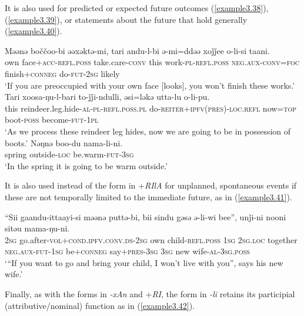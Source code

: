 \documentclass[output=paper,colorlinks,citecolor=brown]{langscibook}
\begin{document}
It is also used for predicted or expected future outcomes (\ref{example3.38}), (\ref{example3.39}), or statements about the future that hold generally (\ref{example3.40}).


\ea
\label{example3.38}
\gll Məənə	boččoo-bi			əəxəktə-mi,		tari	andu-l-bi ə-mi=ddəə			xoǰǰee			o-li-si		taani.\\
    	own		face+\textsc{acc}-\textsc{refl}.\textsc{poss}	take.care-\textsc{conv}	this	work-\textsc{pl}-\textsc{refl}.\textsc{poss}
	\textsc{neg}.\textsc{aux}-\textsc{conv}=\textsc{foc}	finish+\textsc{conneg}	do-\textsc{fut}-\textsc{2sg}	likely\\
\glt `If you are preoccupied with your own face [looks], you won’t finish these works.’
\ex
\label{example3.39}
\gll Tari	xoosa-ŋu-l-bari						to-ǰǰi-ndulli,				əsi=ləkə 	utta-lu		o-li-pu.\\
    	this	reindeer.leg.hide-\textsc{al}-\textsc{pl}-\textsc{refl}.\textsc{poss}.\textsc{pl}	do-\textsc{reiter}+\textsc{ipfv(pres)}-\textsc{loc}.\textsc{refl}	now=\textsc{top}
	boot-\textsc{poss}	become-\textsc{fut}-\textsc{1pl}\\
\glt `As we process these reindeer leg hides, now we are going to be in possession of boots.’
\ex
\label{example3.40}
\gll Nəŋnə	boo-du		nama-li-ni.\\
    		spring	outside-\textsc{loc}	be.warm-\textsc{fut}-\textsc{3sg}\\
\glt `In the spring it is going to be warm outside.’
\z


It is also used instead of the form in +\textit{RIlA} for unplanned, spontaneous events if these are not temporally limited to the immediate future, as in (\ref{example3.41}).


\ea
\label{example3.41}
\gll “Sii	gaandu-ittaayi-si						məənə	puttə-bi,			bii	sindu gəsə		ə-li-wi				bee”,		unǰi-ni			nooni	sitəu mama-ŋu-ni.\\
    		\textsc{2sg}	go.after-\textsc{vol}+\textsc{cond}.\textsc{ipfv}.\textsc{conv}.\textsc{ds}-\textsc{2sg}	own		child-\textsc{refl}.\textsc{poss}	\textsc{1sg}	\textsc{2sg}.\textsc{loc}
	together	\textsc{neg}.\textsc{aux}-\textsc{fut}-\textsc{1sg}		be+\textsc{conneg}	say+\textsc{pres}-\textsc{3sg}	\textsc{3sg}		new
	wife-\textsc{al}-\textsc{3sg.poss}\\
\glt `“If you want to go and bring your child, I won’t live with you”, says his new wife.’
\z


Finally, as with the forms in \textit{-xAn} and +\textit{RI}, the form in \textit{-li} retains its participial (attributive/nominal) function as in (\ref{example3.42}).
\end{document}
